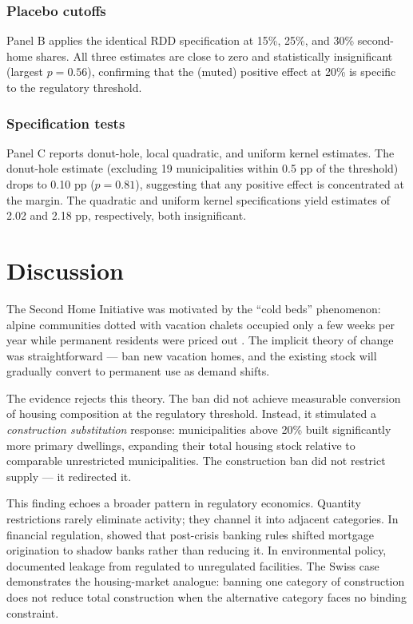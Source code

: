 \documentclass[12pt]{article}
\begin{document}
\subsubsection*{Placebo cutoffs} Panel B applies the identical RDD specification at 15\%, 25\%, and 30\% second-home shares. All three estimates are close to zero and statistically insignificant (largest $p = 0.56$), confirming that the (muted) positive effect at 20\% is specific to the regulatory threshold.

\subsubsection*{Specification tests} Panel C reports donut-hole, local quadratic, and uniform kernel estimates. The donut-hole estimate (excluding 19 municipalities within 0.5 pp of the threshold) drops to 0.10 pp ($p = 0.81$), suggesting that any positive effect is concentrated at the margin. The quadratic and uniform kernel specifications yield estimates of 2.02 and 2.18 pp, respectively, both insignificant.



\section{Discussion}

The Second Home Initiative was motivated by the ``cold beds'' phenomenon: alpine communities dotted with vacation chalets occupied only a few weeks per year while permanent residents were priced out \citep{hilber2020zweitwohnungsinitiative}. The implicit theory of change was straightforward --- ban new vacation homes, and the existing stock will gradually convert to permanent use as demand shifts.

The evidence rejects this theory. The ban did not achieve measurable conversion of housing composition at the regulatory threshold. Instead, it stimulated a \textit{construction substitution} response: municipalities above 20\% built significantly more primary dwellings, expanding their total housing stock relative to comparable unrestricted municipalities. The construction ban did not restrict supply --- it redirected it.

This finding echoes a broader pattern in regulatory economics. Quantity restrictions rarely eliminate activity; they channel it into adjacent categories. In financial regulation, \citet{buchak2018fintech} showed that post-crisis banking rules shifted mortgage origination to shadow banks rather than reducing it. In environmental policy, \citet{fowlie2012emissions} documented leakage from regulated to unregulated facilities. The Swiss case demonstrates the housing-market analogue: banning one category of construction does not reduce total construction when the alternative category faces no binding constraint.
\end{document}
